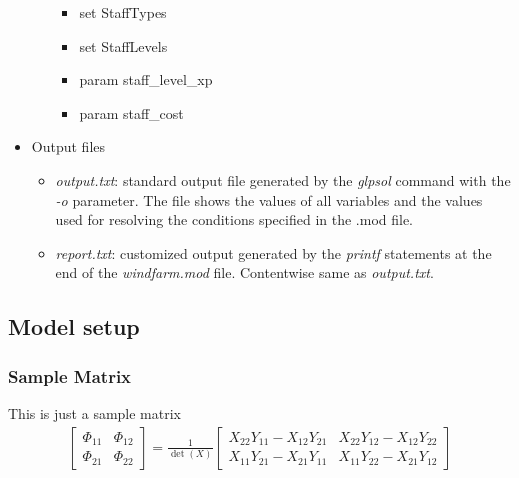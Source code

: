 \begin{itemize}
\begin{itemize}
                \begin{itemize}
                    \item set StaffTypes
                    \item set StaffLevels
                    \item param staff\_level\_xp
                    \item param staff\_cost
                \end{itemize}
            \end{itemize}
        \item Output files
            \begin{itemize}
                \item \textit{output.txt}: standard output file generated by the \textit{glpsol} 
                command with the \textit{-o} parameter. The file shows the values of all variables 
                and the values used for resolving the conditions specified in the .mod file.
                \item \textit{report.txt}: customized output generated by the \textit{printf} 
                statements at the end of the \textit{windfarm.mod} file. Contentwise same as 
                \textit{output.txt}.
            \end{itemize}
    \end{itemize}

    \subsection{Model setup}
        \subsubsection{Sample Matrix}
            This is just a sample matrix\\
            \begin{gather}
                \begin{bmatrix} \Phi_{11} & \Phi_{12} \\ \Phi_{21} & \Phi_{22} \end{bmatrix}
                =
                \frac{1}{\det(X)}
                \begin{bmatrix}
                X_{22} Y_{11} - X_{12} Y_{21} &
                X_{22} Y_{12} - X_{12} Y_{22} \\
                X_{11} Y_{21} - X_{21} Y_{11} &
                X_{11} Y_{22} - X_{21} Y_{12} 
                \end{bmatrix}
            \end{gather}


